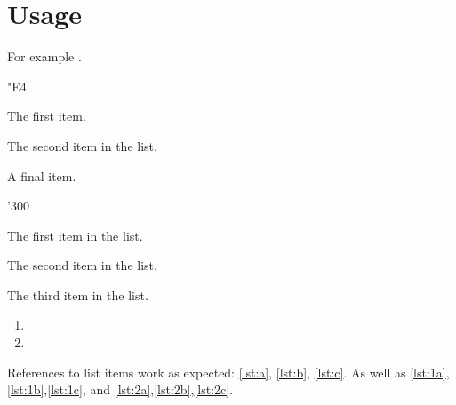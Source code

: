 \documentclass{article}
\begin{document}
\section{Usage}
For example .
\begin{dinglist}{"E4}
  \item The first item.
  \item The second item in the list.
  \item A final item.
\end{dinglist}

\begin{dingautolist}{'300}
 \item The first item in the list. \label{lst:a}
 \item The second item in the list. \label{lst:b}
 \item The third item in the list. \label{lst:c}
\end{dingautolist}

\begin{enumerate}
\item {}
\item {}
\end{enumerate}

References to list items work as expected: \ref{lst:a},
\ref{lst:b}, \ref{lst:c}.
As well as \ref{lst:1a},\ref{lst:1b},\ref{lst:1c},
and \ref{lst:2a},\ref{lst:2b},\ref{lst:2c}.
\end{document}
